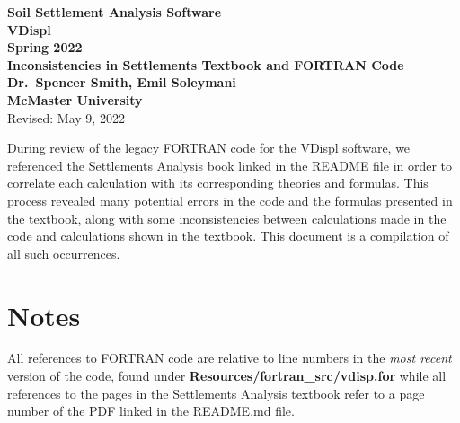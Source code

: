 \documentclass[11pt,fleqn]{article}
\newcommand{\indentpar}{\phantom{=}}
\begin{document}
    \begin{center}

        {\large \textbf{Soil Settlement Analysis Software}}\\[2mm]
        {\large \textbf{VDispl}}\\[2mm]
        {\large \textbf{Spring 2022}}\\[8mm]
        {\huge \textbf{Inconsistencies in Settlements Textbook and FORTRAN Code}}\\[6mm]
        {\large \textbf{Dr.~Spencer Smith, Emil Soleymani}}\\[2mm]
        {\large \textbf{McMaster University}}\\[6mm]
        {\large Revised: May 9, 2022}
      
      \end{center}
      
      \medskip

      \indentpar During review of the legacy FORTRAN code for the VDispl software, 
      we referenced the Settlements Analysis book linked in the README 
      file in order to correlate each calculation with its corresponding 
      theories and formulas. This process revealed many potential errors 
      in the code and the formulas presented in the textbook, along with 
      some inconsistencies between calculations made in the code and 
      calculations shown in the textbook. This document is a compilation 
      of all such occurrences.
      
    
    \pagebreak
    

    \section*{Notes}
    \indentpar All references to FORTRAN code are relative to line numbers 
    in the \emph{most recent} version of the code, found under 
    \textbf{Resources/fortran\_src/vdisp.for} while all references to the pages
    in the Settlements Analysis textbook refer to a page number of the PDF linked 
    in the README.md file.

    
    \medskip
\end{document}
